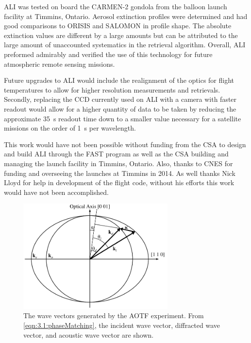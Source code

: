 \documentclass[12pt]{article}
\begin{document}
ALI was tested on board the CARMEN-2 gondola from the balloon launch facility at Timmins, Ontario. Aerosol extinction profiles were determined and had good comparisons to ORISIS and SALOMON in profile shape. The absolute extinction values are different by a large amounts but can be attributed to the large amount of unaccounted systematics in the retrieval algorithm. Overall, ALI preformed admirably and verified the use of this technology for future atmospheric remote sensing missions.

Future upgrades to ALI would include the realignment of the optics for flight temperatures to allow for higher resolution measurements and retrievals. Secondly, replacing the CCD currently used on ALI with a camera with faster readout would allow for a higher quantity of data to be taken by reducing the approximate 35~s readout time down to a smaller value necessary for a satellite missions on the order of 1~s per wavelength.

This work would have not been possible without funding from the CSA to design and build ALI through the FAST program as well as the CSA building and managing the launch facility in Timmins, Ontario. Also, thanks to CNES for funding and overseeing the launches at Timmins in 2014. As well thanks Nick Lloyd for help in development of the flight code, without his efforts this work would have not been accomplished.




\clearpage

\begin{figure}
    \begin{center}
    \includegraphics[width=0.7\textwidth]{./Images/3-1-AOTFWavevectorWithRefraction.pdf}
    \caption{The wave vectors generated by the AOTF experiment. From \autoref{eqn:3.1:phaseMatching}, the incident wave vector, diffracted wave vector, and acoustic wave vector are shown.}
    \label{fig:3.1:ATOFWavevectors}
    \end{center}
\end{figure}
\end{document}
